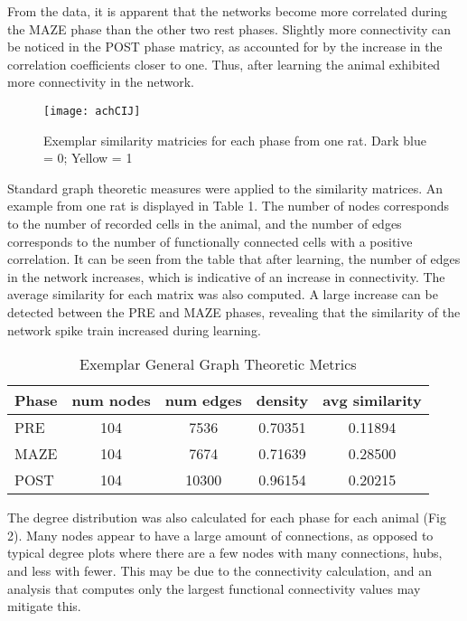 \documentclass[9pt,twocolumn,twoside,lineno]{pnas-new}
\begin{document}
From the data, it is apparent that the networks become more correlated during the MAZE phase than the other two rest phases. Slightly more connectivity can be noticed in the POST phase matricy, as accounted for by the increase in the correlation coefficients closer to one. Thus, after learning the animal exhibited more connectivity in the network.


\begin{figure*}[tbhp]
\centering
\texttt{[image: achCIJ]}
\caption{Exemplar similarity matricies for each phase from one rat. Dark blue = 0; Yellow = 1}
\label{fig:achCIJ}
\end{figure*}

Standard graph theoretic measures were applied to the similarity matrices. An example from one rat is displayed in Table 1. The number of nodes corresponds to the number of recorded cells in the animal, and the number of edges corresponds to the number of functionally connected cells with a positive correlation. It can be seen from the table that after learning, the number of edges in the network increases, which is indicative of an increase in connectivity.  The average similarity for each matrix was also computed. A large increase can be detected between the PRE and MAZE phases, revealing that the similarity of the network spike train increased during learning. 



\begin{table}[tbhp]
\centering
\caption{Exemplar General Graph Theoretic Metrics}
\begin{tabular}{lcccc}
Phase & num nodes & num edges & density & avg similarity\\
\midrule
 PRE & 104& 7536 & 0.70351 & 0.11894\\
MAZE & 104& 7674 & 0.71639 & 0.28500\\
POST & 104 &  10300 & 0.96154& 0.20215\\
\bottomrule
\end{tabular}

\end{table}


The degree distribution was also calculated for each phase for each animal (Fig 2). Many nodes appear to have a large amount of connections, as opposed to typical degree plots where there are a few nodes with many connections, hubs, and less with fewer. This may be due to the connectivity calculation, and an analysis that computes only the largest functional connectivity values may mitigate this.  
\end{document}
